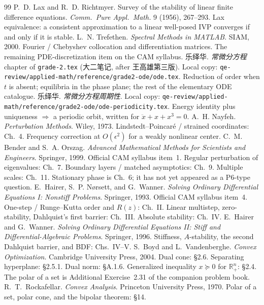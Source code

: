 \documentclass[11pt,a4paper]{article}
\begin{document}
\begin{thebibliography}{99}
P.~D. Lax and R.~D. Richtmyer.
\newblock Survey of the stability of linear finite difference equations.
\newblock \emph{Comm.\ Pure Appl.\ Math.} 9 (1956), 267--293.
\newblock Lax equivalence: a consistent approximation to a linear well-posed IVP converges if and only if it is stable.
L.~N. Trefethen.
\newblock \emph{Spectral Methods in MATLAB}.
\newblock SIAM, 2000.
\newblock Fourier / Chebyshev collocation and differentiation matrices. The remaining PDE-discretization item on the CAM syllabus.
乐绎华.
\newblock \emph{常微分方程} chapter of \texttt{grade-2.tex} (大二笔记, after 王高雄第三版).
\newblock Local copy: \texttt{qe-review/applied-math/reference/grade2-ode/ode.tex}.
\newblock Reduction of order when \(t\) is absent; equilibria in the phase plane; the rest of the elementary ODE catalogue.
乐绎华.
\newblock \emph{常微分方程周期性}.
\newblock Local copy: \texttt{qe-review/applied-math/reference/grade2-ode/ode-periodicity.tex}.
\newblock Energy identity plus uniqueness \(\Rightarrow\) a periodic orbit, written for \(\ddot x+x+x^{3}=0\).
A.~H. Nayfeh.
\newblock \emph{Perturbation Methods}.
\newblock Wiley, 1973.
\newblock Lindstedt--Poincar\'e / strained coordinates: Ch.~4. Frequency correction at \(O(\epsilon^{2})\) for a weakly nonlinear center.
C.~M. Bender and S.~A. Orszag.
\newblock \emph{Advanced Mathematical Methods for Scientists and Engineers}.
\newblock Springer, 1999.
\newblock Official CAM syllabus item~1. Regular perturbation of eigenvalues: Ch.~7. Boundary layers / matched asymptotics: Ch.~9. Multiple scales: Ch.~11. Stationary phase is Ch.~6; it has not yet appeared as a P6-type question.
E.~Hairer, S.~P. N{\o}rsett, and G.~Wanner.
\newblock \emph{Solving Ordinary Differential Equations I: Nonstiff Problems}.
\newblock Springer, 1993.
\newblock Official CAM syllabus item~4. One-step / Runge--Kutta order and \(R(z)\): Ch.~II. Linear multistep, zero-stability, Dahlquist's first barrier: Ch.~III. Absolute stability: Ch.~IV.
E.~Hairer and G.~Wanner.
\newblock \emph{Solving Ordinary Differential Equations II: Stiff and Differential-Algebraic Problems}.
\newblock Springer, 1996.
\newblock Stiffness, \(A\)-stability, the second Dahlquist barrier, and BDF: Chs.~IV--V.
S.~Boyd and L.~Vandenberghe.
\newblock \emph{Convex Optimization}.
\newblock Cambridge University Press, 2004.
\newblock Dual cone: \S2.6. Separating hyperplane: \S2.5.1. Dual norm: \S A.1.6. Generalized inequality \(x\succeq 0\) for \(\mathbb{R}^{n}_{+}\): \S2.4. The polar of a set is Additional Exercise~2.31 of the companion problem book.
R.~T.~Rockafellar.
\newblock \emph{Convex Analysis}.
\newblock Princeton University Press, 1970.
\newblock Polar of a set, polar cone, and the bipolar theorem: \S14.
\end{thebibliography}
\end{document}
